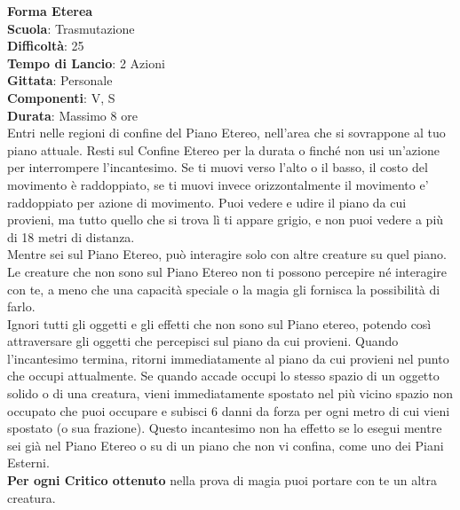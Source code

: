 \begin{multicols}{2}
\medskip\textbf{Forma Eterea}\\
\textbf{Scuola}: Trasmutazione\\
\textbf{Difficoltà}: 25\\
\textbf{Tempo di Lancio}: 2 Azioni\\
\textbf{Gittata}: Personale\\
\textbf{Componenti}: V, S\\
\textbf{Durata}: Massimo 8 ore\\
Entri nelle regioni di confine del Piano Etereo, nell'area che si sovrappone al tuo piano attuale. Resti sul Confine Etereo per la durata o finché non usi un'azione per interrompere l'incantesimo. Se ti muovi verso l'alto o il basso, il costo del movimento è raddoppiato, se ti muovi invece orizzontalmente il movimento e' raddoppiato per azione di movimento. Puoi vedere e udire il piano da cui provieni, ma tutto quello che si trova lì ti appare grigio, e non puoi vedere a più di 18 metri di distanza.\\
Mentre sei sul Piano Etereo, può interagire solo con altre creature su quel piano. Le creature che non sono sul Piano Etereo non ti possono percepire né interagire con te, a meno che una capacità speciale o la magia gli fornisca la possibilità di farlo.\\
Ignori tutti gli oggetti e gli effetti che non sono sul Piano etereo, potendo così attraversare gli oggetti che percepisci sul piano da cui provieni. Quando l'incantesimo termina, ritorni immediatamente al piano da cui provieni nel punto che occupi attualmente. Se quando accade occupi lo stesso spazio di un oggetto solido o di una creatura, vieni immediatamente spostato nel più vicino spazio non occupato che puoi occupare e subisci 6 danni da forza per ogni metro di cui vieni spostato (o sua frazione). Questo incantesimo non ha effetto se lo esegui mentre sei già nel Piano Etereo o su di un piano che non vi confina, come uno dei Piani Esterni.\\
\textbf{Per ogni Critico ottenuto} nella prova di magia puoi portare con te un altra creatura.


\end{multicols}
